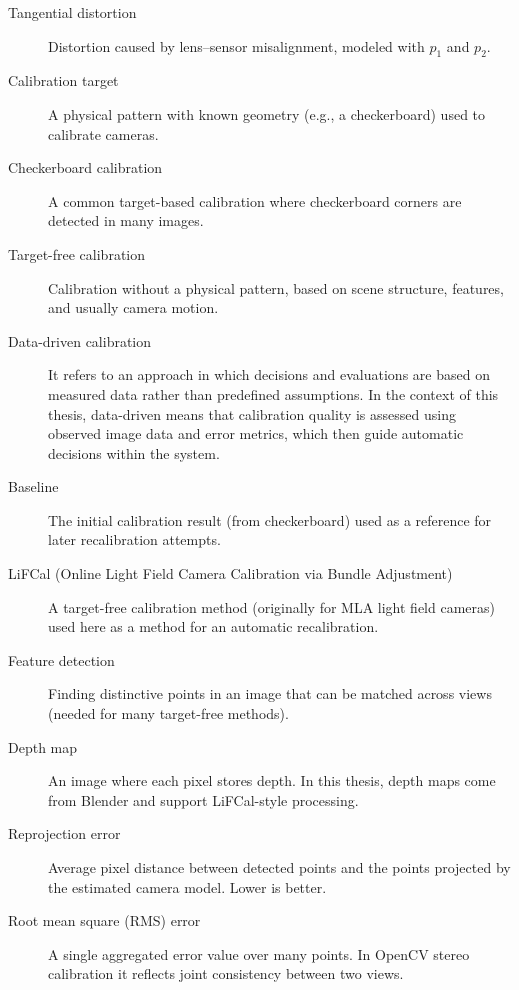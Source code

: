 \documentclass[12pt]{scrartcl}
\begin{document}
\begin{description}
\item[Tangential distortion]
Distortion caused by lens–sensor misalignment, modeled with $p_1$ and $p_2$.

\item[Calibration target]
A physical pattern with known geometry (e.g., a checkerboard) used to calibrate cameras.

\item[Checkerboard calibration]
A common target-based calibration where checkerboard corners are detected in many images.

\item[Target-free calibration]
Calibration without a physical pattern, based on scene structure, features, and usually camera motion.

\item[Data-driven calibration] 
It refers to an approach in which decisions and evaluations are based on measured data rather than predefined assumptions. In the context of this thesis, data-driven means that calibration quality is assessed using observed image data and error metrics, which then guide automatic decisions within the system.

\item[Baseline]
The initial calibration result (from checkerboard) used as a reference for later recalibration attempts.

\item[LiFCal (Online Light Field Camera Calibration via Bundle Adjustment)]
A target-free calibration method (originally for MLA light field cameras) used here as a method for an automatic recalibration.

\item[Feature detection]
Finding distinctive points in an image that can be matched across views (needed for many target-free methods).

\item[Depth map]
An image where each pixel stores depth. In this thesis, depth maps come from Blender and support LiFCal-style processing.

\item[Reprojection error]
Average pixel distance between detected points and the points projected by the estimated camera model. Lower is better.

\item[Root mean square (RMS) error]
A single aggregated error value over many points. In OpenCV stereo calibration it reflects joint consistency between two views.


\end{description}
\end{document}

